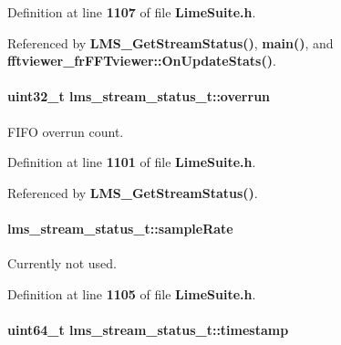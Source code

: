 Definition at line {\bf 1107} of file {\bf Lime\+Suite.\+h}.



Referenced by {\bf L\+M\+S\+\_\+\+Get\+Stream\+Status()}, {\bf main()}, and {\bf fftviewer\+\_\+fr\+F\+F\+Tviewer\+::\+On\+Update\+Stats()}.

\paragraph[{overrun}]{\setlength{\rightskip}{0pt plus 5cm}uint32\+\_\+t lms\+\_\+stream\+\_\+status\+\_\+t\+::overrun}\label{structlms__stream__status__t_a130e766b4b196781014c9e9f528a35bc}


F\+I\+FO overrun count. 



Definition at line {\bf 1101} of file {\bf Lime\+Suite.\+h}.



Referenced by {\bf L\+M\+S\+\_\+\+Get\+Stream\+Status()}.

\paragraph[{sample\+Rate}]{ lms\+\_\+stream\+\_\+status\+\_\+t\+::sample\+Rate}\label{structlms__stream__status__t_a71aaae6b50c72f33c985168885ff7648}


Currently not used. 



Definition at line {\bf 1105} of file {\bf Lime\+Suite.\+h}.

\paragraph[{timestamp}]{\setlength{\rightskip}{0pt plus 5cm}uint64\+\_\+t lms\+\_\+stream\+\_\+status\+\_\+t\+::timestamp}\label{structlms__stream__status__t_a08832cf2b226f61d54558219371e5b10}


